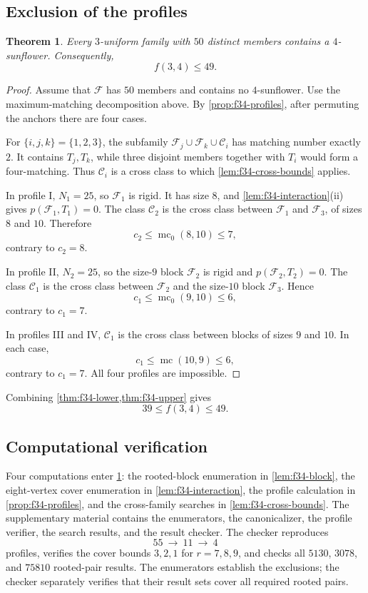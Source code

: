 \documentclass[11pt]{article}
\numberwithin{equation}{section}
\newtheorem{theorem}{Theorem}[section]
\theoremstyle{definition}
\theoremstyle{remark}
\newcommand{\F}{\mathcal F}
\newcommand{\C}{\mathcal C}
\newcommand{\mc}{\operatorname{mc}}
\newcommand{\mcz}{\operatorname{mc}_0}
\begin{document}
\subsection{Exclusion of the profiles}

\begin{theorem}
\label{thm:f34-upper}
Every $3$-uniform family with $50$ distinct members contains a
$4$-sunflower. Consequently,
\[
 f(3,4)\le49.
\]
\end{theorem}

\begin{proof}
Assume that $\F$ has $50$ members and contains no $4$-sunflower. Use the
maximum-matching decomposition above. By \cref{prop:f34-profiles}, after
permuting the anchors there are four cases.

For $\{i,j,k\}=\{1,2,3\}$, the subfamily
$\F_j\cup\F_k\cup\C_i$ has matching number exactly $2$. It contains
$T_j,T_k$, while three disjoint members together with $T_i$ would form a
four-matching. Thus $\C_i$ is a cross class to which
\cref{lem:f34-cross-bounds} applies.

In profile I, $N_1=25$, so $\F_1$ is rigid. It has size $8$, and
\cref{lem:f34-interaction}(ii) gives $p(\F_1,T_1)=0$. The class $\C_2$ is
the cross class between $\F_1$ and $\F_3$, of sizes $8$ and $10$. Therefore
\[
 c_2\le\mcz(8,10)\le7,
\]
contrary to $c_2=8$.

In profile II, $N_2=25$, so the size-$9$ block $\F_2$ is rigid and
$p(\F_2,T_2)=0$. The class $\C_1$ is the cross class between $\F_2$ and the
size-$10$ block $\F_3$. Hence
\[
 c_1\le\mcz(9,10)\le6,
\]
contrary to $c_1=7$.

In profiles III and IV, $\C_1$ is the cross class between blocks of sizes
$9$ and $10$. In each case,
\[
 c_1\le\mc(10,9)\le6,
\]
contrary to $c_1=7$. All four profiles are impossible.
\end{proof}

Combining \cref{thm:f34-lower,thm:f34-upper} gives
\[
 39\le f(3,4)\le49.
\]

\subsection{Computational verification}

Four computations enter \cref{thm:f34-upper}: the rooted-block enumeration in
\cref{lem:f34-block}, the eight-vertex cover enumeration in
\cref{lem:f34-interaction}, the profile calculation in
\cref{prop:f34-profiles}, and the cross-family searches in
\cref{lem:f34-cross-bounds}. The supplementary material contains the enumerators, the canonicalizer, the
profile verifier, the search results, and the result checker. The checker reproduces
\[
 55\ \longrightarrow\ 11\ \longrightarrow\ 4
\]
profiles, verifies the cover bounds $3,2,1$ for $r=7,8,9$, and
checks all $5130$, $3078$, and $75810$ rooted-pair results. The enumerators
establish the exclusions; the checker separately verifies that their result
sets cover all required rooted pairs.
\end{document}
